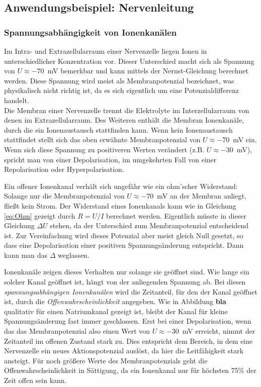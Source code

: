 \subsection{Anwendungsbeispiel: Nervenleitung}

\subsubsection{Spannungsabhängigkeit von Ionenkanälen}

Im Intra- und Extrazellularraum einer Nervenzelle liegen Ionen in unterschiedlicher Konzentration vor. Dieser Unterschied macht sich als Spannung von $U\approx -70$~mV bemerkbar und kann mittels der Nernst-Gleichung berechnet werden. Diese Spannung wird meist als Membranpotenzial bezeichnet, was physikalisch nicht richtig ist, da es sich eigentlich um eine Potenzialdifferenz handelt.\\

\noindent
Die Membran einer Nervenzelle trennt die Elektrolyte im Interzellularraum von denen im Extrazellularraum. Des Weiteren enthält die Membran Ionenkanäle, durch die ein Ionenaustausch stattfinden kann. Wenn kein Ionenaustausch stattfindet stellt sich das oben erwähnte Membranpotenzial von $U\approx -70$~mV ein. Wenn sich diese Spannung zu positiveren Werten verändert (z.B. $U\approx -30$~mV), spricht man von einer Depolarisation, im umgekehrten Fall von einer Repolarisation oder Hyperpolarisation.

\noindent
Ein offener Ionenkanal verhält sich ungefähr wie ein ohm'scher Widerstand: Solange nur die Membranpotenzial von $U\approx -70$~mV an der Membran anliegt, fließt kein Strom. Der Widerstand eines Ionenkanals kann wie in Gleichung \ref{eq:Ohm} gezeigt durch $R=U/I$ berechnet werden. Eigentlich müsste in dieser Gleichung $\Delta U$ stehen, da der Unterschied zum Membranpotenzial entscheidend ist. Zur Vereinfachung wird dieses Potenzial aber meist gleich Null gesetzt, so dass eine Depolarisation einer positiven Spannungsänderung entspricht. Dann kann man das $\Delta$ weglassen.

\noindent
Ionenkanäle zeigen dieses Verhalten nur solange sie geöffnet sind. Wie lange ein solcher Kanal geöffnet ist, hängt von der anliegenden Spannung ab. Bei diesen \textit{spannungsabhängigen Ionenkanälen} wird die Zeitanteil, für den der Kanal geöffnet ist, durch die \textit{Offenwahrscheinlichkeit} angegeben.
Wie in Abbildung \textbf{bla} qualitativ für einen Natriumkanal gezeigt ist, bleibt der Kanal für kleine Spannungsänderung fast immer geschlossen. Erst bei einer Depolarisation, wenn das das Membranpotenzial also einen Wert von $U\approx -30$~mV erreicht, nimmt der Zeitanteil im offenen Zustand stark zu. Dies entspricht dem Bereich, in dem eine Nervenzelle ein neues Aktionspotenzial auslöst, da hier die Leitfähigkeit stark ansteigt. Für noch größere Werte des Membranpotenzials geht die Offenwahrscheinlichkeit in Sättigung, da ein Ionenkanal nur für höchsten 75\% der Zeit offen sein kann.

